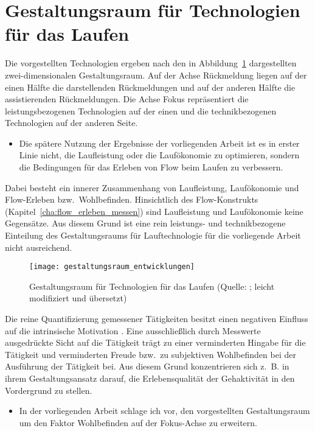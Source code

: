 

\section{Gestaltungsraum für Technologien für das Laufen} 

\label{sec:gestaltungsraum_fur_technologien_fur_das_laufen}

Die vorgestellten Technologien ergeben nach \citet{Jensen2014} den in Abbildung~\ref{fig:gestaltungsraum_entwicklungen} dargestellten zwei-dimensionalen Gestaltungsraum. Auf der Achse Rückmeldung liegen auf der einen Hälfte die darstellenden Rückmeldungen und auf der anderen Hälfte die assistierenden Rückmeldungen. Die Achse Fokus repräsentiert die leistungsbezogenen Technologien auf der einen und die technikbezogenen Technologien auf der anderen Seite. 
\begin{itemize}
	
	\item Die spätere Nutzung der Ergebnisse der vorliegenden Arbeit ist es in erster Linie nicht, die Laufleistung oder die Laufökonomie zu optimieren, sondern die Bedingungen für das Erleben von Flow beim Laufen zu verbessern. 
\end{itemize}

Dabei besteht ein innerer Zusammenhang von Laufleistung, Laufökonomie und Flow-Erleben bzw.\ Wohlbefinden. Hinsichtlich des Flow-Konstrukts (Kapitel~\ref{cha:flow_erleben_messen}) sind Laufleistung und Laufökonomie keine Gegensätze. Aus diesem Grund ist eine rein leistungs- und technikbezogene Einteilung des Gestaltungsraums für Lauftechnologie für die vorliegende Arbeit nicht ausreichend. 
\begin{figure}
	[!htb] \centering 
	\texttt{[image: gestaltungsraum\_entwicklungen]} \caption[Gestaltungsraum für Technologien für das Laufen]{Gestaltungsraum für Technologien für das Laufen (Quelle: \citet{Jensen2014}; leicht modifiziert und übersetzt)}\label{fig:gestaltungsraum_entwicklungen} 
\end{figure}

Die reine Quantifizierung gemessener Tätigkeiten besitzt einen negativen Einfluss auf die intrinsische Motivation \citep{Etkin2016}. Eine ausschließlich durch Messwerte ausgedrückte Sicht auf die Tätigkeit trägt zu einer verminderten Hingabe für die Tätigkeit und verminderten Freude bzw.\ zu subjektiven Wohlbefinden bei der Ausführung der Tätigkeit bei. Aus diesem Grund konzentrieren sich z.~B. \citet{Hajinejad2015} in ihrem Gestaltungsansatz darauf, die Erlebensqualität der Gehaktivität in den Vordergrund zu stellen. 
\begin{itemize}
	
	\item In der vorliegenden Arbeit schlage ich vor, den vorgestellten Gestaltungsraum um den Faktor Wohlbefinden auf der Fokus-Achse zu erweitern. 
\end{itemize}

